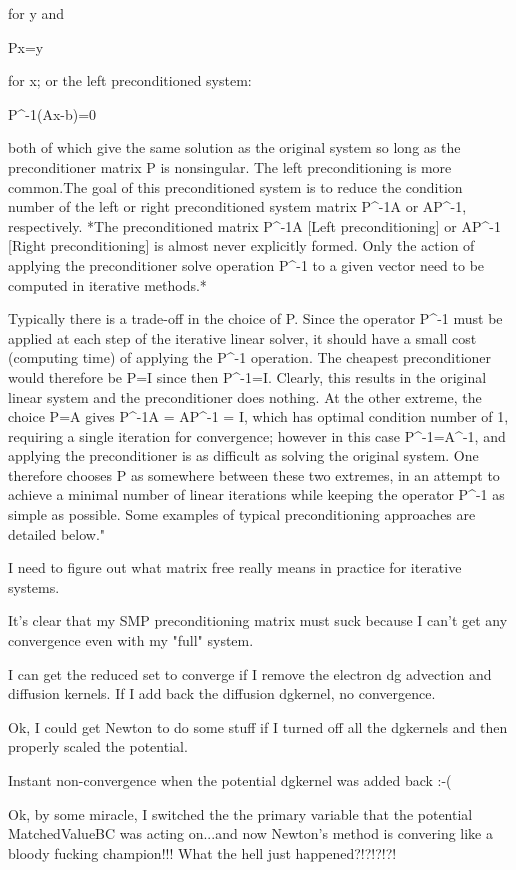 {for y and

    Px=y

for x; or the left preconditioned system:

    P^{-1}(Ax-b)=0

both of which give the same solution as the original system so long as the preconditioner matrix P is nonsingular. The left preconditioning is more common.The goal of this preconditioned system is to reduce the condition number of the left or right preconditioned system matrix P^{-1}A or AP^{-1}, respectively. *The preconditioned matrix P^{-1}A [Left preconditioning] or AP^{-1} [Right preconditioning] is almost never explicitly formed. Only the action of applying the preconditioner solve operation P^{-1} to a given vector need to be computed in iterative methods.*

Typically there is a trade-off in the choice of P. Since the operator P^{-1} must be applied at each step of the iterative linear solver, it should have a small cost (computing time) of applying the P^{-1} operation. The cheapest preconditioner would therefore be P=I since then P^{-1}=I. Clearly, this results in the original linear system and the preconditioner does nothing. At the other extreme, the choice P=A gives P^{-1}A = AP^{-1} = I, which has optimal condition number of 1, requiring a single iteration for convergence; however in this case P^{-1}=A^{-1}, and applying the preconditioner is as difficult as solving the original system. One therefore chooses P as somewhere between these two extremes, in an attempt to achieve a minimal number of linear iterations while keeping the operator P^{-1} as simple as possible. Some examples of typical preconditioning approaches are detailed below."

I need to figure out what matrix free really means in practice for iterative systems.

It's clear that my SMP preconditioning matrix must suck because I can't get any convergence even with my "full" system.

I can get the reduced set to converge if I remove the electron dg advection and diffusion kernels. If I add back the diffusion dgkernel, no convergence.

Ok, I could get Newton to do some stuff if I turned off all the dgkernels and then properly scaled the potential.

Instant non-convergence when the potential dgkernel was added back :-(

Ok, by some miracle, I switched the the primary variable that the potential MatchedValueBC was acting on...and now Newton's method is convering like a bloody fucking champion!!! What the hell just happened?!?!?!?!

}

